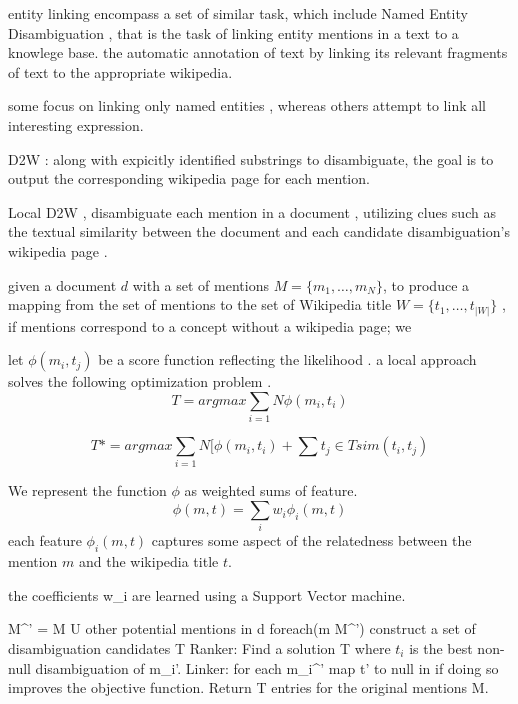 \documentclass{article}
\begin{document}
entity linking encompass a set of similar task, which include Named Entity 
Disambiguation , that is the task of linking entity mentions in a text to
a knowlege base.         the automatic annotation of text by linking its relevant fragments of text to the appropriate wikipedia. 

some focus on linking only named entities , whereas others attempt to link
all interesting expression. 

D2W : along with expicitly identified substrings to disambiguate, 
    the goal is to  output the corresponding wikipedia page for each mention.

Local D2W , disambiguate each mention in a document , utilizing clues such
as the textual similarity between the document and each candidate disambiguation's wikipedia page .

given a document $d$ with  a set of mentions $M = \{m_1,\ldots,m_N\}$,
to produce a mapping from the  set of mentions to the set of Wikipedia title
$W = \{ t_1,\ldots,t_|W|\} $ , if mentions correspond to a concept without a wikipedia page; we 

let $\phi(m_i, t_j)$ be a score function reflecting the likelihood .
a local approach solves the following optimization problem . 
\[ T = arg max \sum_{i=1}{N} \phi(m_i,t_i) \]

\[T* = arg max \sum_{i=1}{N}[ \phi(m_i,t_i) +  \sum{t_j \in T} sim(t_i,t_j) \]
 
We represent the function $\phi$ as weighted sums of feature. 
\[ \phi(m,t) = \sum_{i} w_i \phi_i(m,t) \] 
each feature $\phi_i(m,t)$ captures some aspect of the relatedness between the 
mention $m$ and the wikipedia title $t$. 

the coefficients w_i are learned using a Support Vector machine. 

\begin{algorithm}
  M^' = M U { other potential mentions in d}
  foreach(m \in M^')
    construct a set of disambiguation candidates T
  Ranker: Find a solution T where $t_i$ is the best non-null disambiguation of
  m_i'.
  Linker: for each m_i^' map t' to null in if doing so improves the objective function. 
  Return T entries for the original mentions M.

\end{algorithm}
\end{document}
